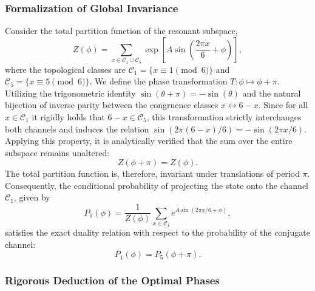 \documentclass[reprint,aps,pra,superscriptaddress,nofootinbib]{revtex4-2}
\theoremstyle{plain}
\theoremstyle{definition}
\theoremstyle{remark}
\begin{document}
\subsubsection*{Formalization of Global Invariance}

Consider the total partition function of the resonant subspace,
\begin{equation}
Z(\phi) = \sum_{x \in \mathcal{C}_1 \cup \mathcal{C}_5} \exp\left[A \sin\left(\frac{2\pi x}{6} + \phi\right)\right],
\end{equation}
where the topological classes are $\mathcal{C}_1 = \{x \equiv 1 \pmod{6}\}$ and $\mathcal{C}_5 = \{x \equiv 5 \pmod{6}\}$. We define the phase transformation $T: \phi \mapsto \phi + \pi$. Utilizing the trigonometric identity $\sin(\theta+\pi) = -\sin(\theta)$ and the natural bijection of inverse parity between the congruence classes $x \leftrightarrow 6-x$. Since for all $x \in \mathcal{C}_1$ it rigidly holds that $6-x \in \mathcal{C}_5$, this transformation strictly interchanges both channels and induces the relation $\sin(2\pi(6-x)/6) = -\sin(2\pi x/6)$. Applying this property, it is analytically verified that the sum over the entire subspace remains unaltered:
\begin{equation}
Z(\phi + \pi) = Z(\phi).
\label{eq:periodicidad_Z}
\end{equation}
The total partition function is, therefore, invariant under translations of period $\pi$. Consequently, the conditional probability of projecting the state onto the channel $\mathcal{C}_1$, given by
\begin{equation}
P_1(\phi) = \frac{1}{Z(\phi)}\sum_{x\in\mathcal{C}_1} e^{A\sin(2\pi x/6 + \phi)},
\end{equation}
satisfies the exact duality relation with respect to the probability of the conjugate channel:
\begin{equation}
P_1(\phi) = P_5(\phi+\pi).
\label{eq:dualidad_prob}
\end{equation}

\subsubsection*{Rigorous Deduction of the Optimal Phases}
\end{document}
